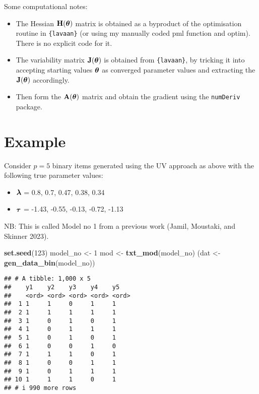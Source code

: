 \documentclass[
]{article}
\newenvironment{Shaded}{\begin{snugshade}}{\end{snugshade}}
\newcommand{\DecValTok}[1]{\textcolor[rgb]{0.00,0.00,0.81}{#1}}
\newcommand{\FunctionTok}[1]{\textcolor[rgb]{0.13,0.29,0.53}{\textbf{#1}}}
\newcommand{\NormalTok}[1]{#1}
\newcommand{\OtherTok}[1]{\textcolor[rgb]{0.56,0.35,0.01}{#1}}
\providecommand{\tightlist}{%
  \setlength{\itemsep}{0pt}\setlength{\parskip}{0pt}}
\begin{document}
Some computational notes:

\begin{itemize}
\tightlist
\item
  The Hessian \({\mathbf H}({\boldsymbol\theta})\) matrix is obtained as a byproduct of the
  optimisation routine in \texttt{\{lavaan\}} (or using my manually
  coded pml function and optim). There is no explicit code for it.
\item
  The variability matrix \({\mathbf J}({\boldsymbol\theta})\) is obtained from
  \texttt{\{lavaan\}}, by tricking it into accepting starting values
  \({\boldsymbol\theta}\) as converged parameter values and extracting the
  \({\mathbf J}({\boldsymbol\theta})\) accordingly.
\item
  Then form the \({\mathbf A}({\boldsymbol\theta})\) matrix and obtain the gradient using
  the \texttt{numDeriv} package.
\end{itemize}

\hypertarget{example}{%
\section{Example}\label{example}}

Consider \(p=5\) binary items generated using the UV approach as above
with the following true parameter values:

\begin{itemize}
\tightlist
\item
  \({\boldsymbol\lambda}\) = 0.8, 0.7, 0.47, 0.38, 0.34
\item
  \({\boldsymbol\tau}\) = -1.43, -0.55, -0.13, -0.72, -1.13
\end{itemize}

NB: This is called Model no 1 from a previous work (Jamil, Moustaki, and
Skinner 2023).

\begin{Shaded}
\begin{Highlighting}[]
\FunctionTok{set.seed}\NormalTok{(}\DecValTok{123}\NormalTok{)}
\NormalTok{model\_no }\OtherTok{\textless{}{-}} \DecValTok{1}
\NormalTok{mod }\OtherTok{\textless{}{-}} \FunctionTok{txt\_mod}\NormalTok{(model\_no)}
\NormalTok{(dat }\OtherTok{\textless{}{-}} \FunctionTok{gen\_data\_bin}\NormalTok{(model\_no))}
\end{Highlighting}
\end{Shaded}

\begin{verbatim}
## # A tibble: 1,000 x 5
##    y1    y2    y3    y4    y5   
##    <ord> <ord> <ord> <ord> <ord>
##  1 1     1     0     1     1    
##  2 1     1     1     1     1    
##  3 1     0     1     0     1    
##  4 1     0     1     1     1    
##  5 1     0     1     0     1    
##  6 1     0     0     1     0    
##  7 1     1     1     0     1    
##  8 1     0     0     1     1    
##  9 1     0     1     1     1    
## 10 1     1     1     0     1    
## # i 990 more rows
\end{verbatim}
\end{document}
